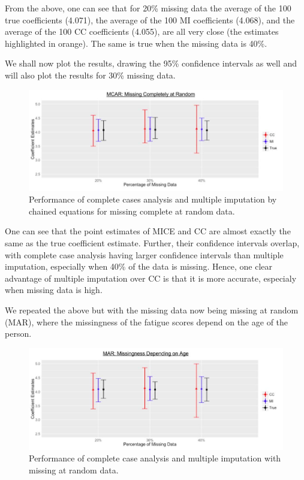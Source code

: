 \documentclass[fleqn,10pt]{wlscirep}\usepackage[]{graphicx}\usepackage[]{color}
\begin{document}
From the above, one can see that for 20\% missing data the average of the 100 true coefficients (4.071), the average of the 100 MI coefficients (4.068), and the average of the 100 CC coefficients (4.055), are all very close (the estimates highlighted in orange). The same is true when the missing data is 40\%.

We shall now plot the results, drawing the 95\% confidence intervals as well and will also plot the results for 30\% missing data. 

\begin{figure}[H]
\centering
\includegraphics[width=\linewidth]{mcar_res_plot}
\caption{Performance of complete cases analysis and multiple imputation by chained equations for missing complete at random data.}
\label{fig:mcar_res_plot}
\end{figure}

One can see that the point estimates of MICE and CC are almost exactly the same as the true coefficient estimate. Further, their confidence intervals overlap, with complete case analysis having larger confidence intervals than multiple imputation, especially when 40\% of the data is missing. Hence, one clear advantage of multiple imputation over CC is that it is more accurate, especialy when missing data is high. 

We repeated the above but with the missing data now being missing at random (MAR), where the missingness of the fatigue scores depend on the age of the person. 


\begin{figure}[H]
\centering
\includegraphics[width=\linewidth]{mar_res_plot}
\caption{Performance of complete case analysis and multiple imputation with missing at random data.}
\label{fig:mar_res_plot}
\end{figure}
\end{document}
